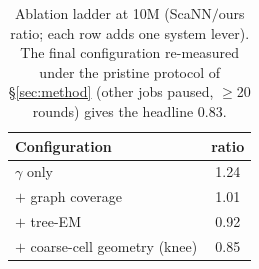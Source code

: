 \documentclass{article}
\begin{document}
\begin{table}[t]
\centering
\caption{Ablation ladder at 10M (ScaNN$/$ours ratio; each row adds one system lever). The final configuration re-measured under the pristine protocol of \S\ref{sec:method} (other jobs paused, $\ge$20 rounds) gives the headline $0.83$.}
\label{tab:ablation}
\begin{tabular}{lc}
\toprule
Configuration & ratio \\
\midrule
$\gamma$ only                         & 1.24 \\
$+$ graph coverage                    & 1.01 \\
$+$ tree-EM                           & 0.92 \\
$+$ coarse-cell geometry (knee)       & 0.85 \\
\bottomrule
\end{tabular}
\end{table}
\end{document}
